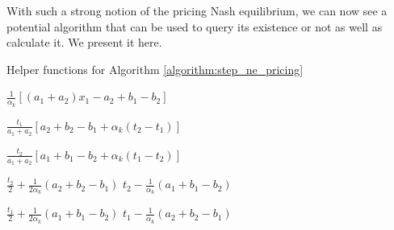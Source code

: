 \documentclass[10pt,a4paper]{book}
\theoremstyle{definition}
\theoremstyle{comment}
\begin{document}
With such a strong notion of the pricing Nash equilibrium, we can now see a potential algorithm that can be used to query its existence or not as well as calculate it.
We present it here.

\begin{algorithm}
	\caption{Helper functions for Algorithm \ref{algorithm:step_ne_pricing}}
	\label{algorithm:step_helper_functions}
	\begin{algorithmic}[1]
		 \label{function:toll_diff}
		\State \Return $\frac{1}{\alpha_k}[(a_1 + a_2) x_1 - a_2 + b_1 - b_2]$
		\EndFunction

		\Statex
		 \label{function:profit_1}
		\State \Return $\frac{t_1}{a_1 + a_2} [a_2 + b_2 - b_1 + \alpha_k (t_2 - t_1)]$
		\EndFunction

		\Statex
		 \label{function:profit_2}
		\State \Return $\frac{t_2}{a_1 + a_2} [a_1 + b_1 - b_2 + \alpha_k (t_1 - t_2)]$
		\EndFunction

		\Statex
		 \label{function:best_response_1}
		\State \Return $\frac{t_2}{2} + \frac{1}{2 \alpha_k}(a_2 + b_2 - b_1)$
		\Else
		\State \Return $t_2 - \frac{1}{\alpha_k}(a_1 + b_1 - b_2)$
		\EndIf
		\EndFunction

		\Statex
		 \label{function:best_response_2}
		\State \Return $\frac{t_1}{2} + \frac{1}{2 \alpha_k}(a_1 + b_1 - b_2)$
		\Else
		\State \Return $t_1 - \frac{1}{\alpha_k}(a_2 + b_2 - b_1)$
		\EndIf
		\EndFunction
	\end{algorithmic}
\end{algorithm}
\end{document}
